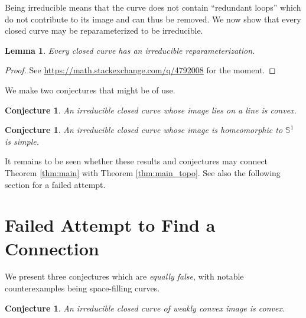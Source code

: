 \documentclass{amsart}
\newtheorem{lemma}[proposition]{Lemma}
\newtheorem{conjecture}[proposition]{Conjecture}
\theoremstyle{definition}
\theoremstyle{remark}
\begin{document}
Being irreducible means that the curve does not contain
``redundant loops'' which do not contribute to its image
and can thus be removed. We now show that every closed curve
may be reparameterized to be irreducible.

\begin{lemma}
    \label{lem:irr_exists}
    Every closed curve has an irreducible reparameterization.
\end{lemma}

\begin{proof}
    See \url{https://math.stackexchange.com/q/4792008} for the moment.
\end{proof}

We make two conjectures that might be of use.

\begin{conjecture}
    \label{con:irr_linear_convex}
    An irreducible closed curve whose image lies on a line is convex.
\end{conjecture}


\begin{conjecture}
    \label{con:irr_simple}
    An irreducible closed curve whose image is homeomorphic to
    $\mathbb{S}^1$ is simple.
\end{conjecture}

It remains to be seen whether these results and conjectures may
connect Theorem \ref{thm:main} with Theorem \ref{thm:main_topo}.
See also the following section for a failed attempt.

\section{Failed Attempt to Find a Connection}

We present three conjectures which are \emph{equally false},
with notable counterexamples being space-filling curves.

\begin{conjecture}
    \label{con:irr_convex}
    An irreducible closed curve of weakly convex image is convex.
\end{conjecture}
\end{document}
